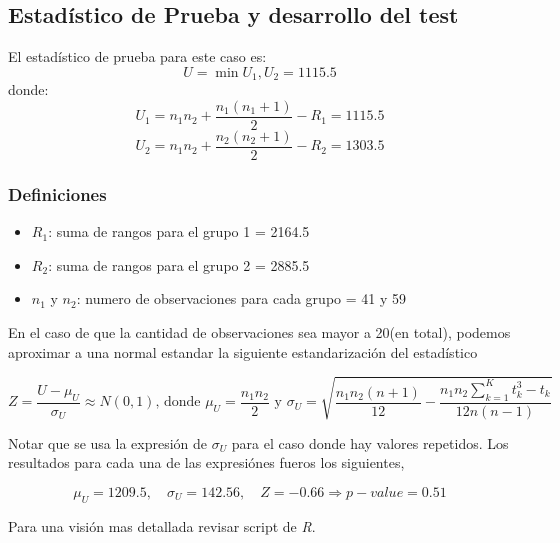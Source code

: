 \documentclass{article}
\begin{document}
    \subsection{Estad\'istico de Prueba y desarrollo del test}
    El estad\'istico de prueba para este caso es:
    \begin{equation}
        U = \min {U_1, U_2} = 1115.5 
    \end{equation}
    donde:
    \begin{equation}
        U_1 = n_1 n_2 + \frac{n_1(n_1+1)}{2} - R_1 = 1115.5
    \end{equation}
    \begin{equation}
        U_2 = n_1 n_2 + \frac{n_2(n_2+1)}{2} - R_2 = 1303.5
    \end{equation}

    \subsubsection{Definiciones}

    \begin{itemize}
        \item $R_1$: suma de rangos para el grupo 1 = 2164.5
        \item $R_2$: suma de rangos para el grupo 2 = 2885.5
        \item $n_1$ y $n_2$: numero de observaciones para cada grupo = 41 y 59
    \end{itemize}

    En el caso de que la cantidad de observaciones sea mayor a 20(en total), podemos aproximar a una normal estandar la siguiente estandarizaci\'on del estad\'istico

    \begin{equation}
        Z = \frac{U - \mu_U}{\sigma_U} \approx N(0, 1) \text{, donde } \mu_U = \frac{n_1 n_2}{2} \text{ y } \sigma_U = \sqrt{\frac{n_1 n_2 (n + 1)}{12}-\frac{n_1 n_2 \sum_{k=1}^K t_k^3 - t_k}{12n(n - 1)}}
    \end{equation}

    Notar que se usa la expresi\'on de $\sigma_U$ para el caso donde hay valores repetidos. Los resultados para cada una de las expresi\'ones fueros los siguientes,

    \begin{equation}
        \mu_U = 1209.5,\quad \sigma_U = 142.56,\quad Z = -0.66 \Rightarrow p-value = 0.51 
    \end{equation}
    
    Para una visi\'on mas detallada revisar script de \textit{R}.
\end{document}
